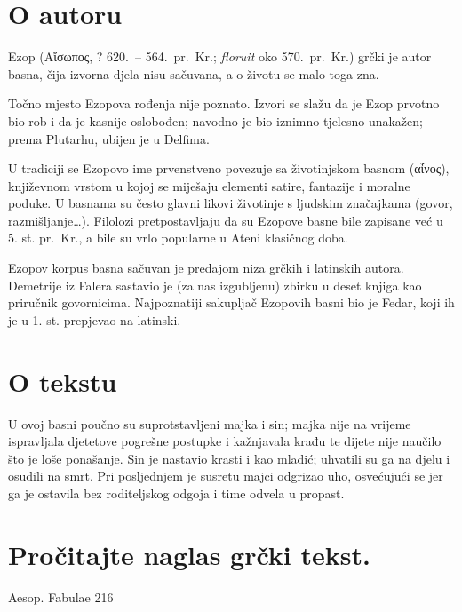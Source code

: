 \section*{O autoru}

Ezop \textgreek[variant=ancient]{(Αἴσωπος,} ? 620.\ – 564.\ pr.~Kr.; \textit{floruit} oko 570.\ pr.~Kr.) grčki je autor basna, čija izvorna djela nisu sačuvana, a o životu se malo toga zna.

Točno mjesto Ezopova rođenja nije poznato. Izvori se slažu da je Ezop prvotno bio rob i da je kasnije oslobođen; navodno je bio iznimno tjelesno unakažen; prema Plutarhu, ubijen je u Delfima.

U tradiciji se Ezopovo ime prvenstveno povezuje sa životinjskom basnom \textgreek[variant=ancient]{(αἶνος),} književnom vrstom u kojoj se miješaju elementi satire, fantazije i moralne poduke. U basnama su često glavni likovi životinje s ljudskim značajkama (govor, razmišljanje\dots). Filolozi pretpostavljaju da su Ezopove basne bile zapisane već u 5. st. pr.~Kr., a bile su vrlo popularne u Ateni klasičnog doba.

Ezopov korpus basna sačuvan je predajom niza grčkih i latinskih autora. Demetrije iz Falera sastavio je (za nas izgubljenu) zbirku u deset knjiga kao priručnik govornicima. Najpoznatiji sakupljač Ezopovih basni bio je Fedar, koji ih je u 1. st. prepjevao na latinski.


\section*{O tekstu}

U ovoj basni poučno su suprotstavljeni majka i sin; majka nije na vrijeme ispravljala djetetove pogrešne postupke i kažnjavala krađu te dijete nije naučilo što je loše ponašanje. Sin je nastavio krasti i kao mladić; uhvatili su ga na djelu i osudili na smrt. Pri posljednjem je susretu majci odgrizao uho, osvećujući se jer ga je ostavila bez roditeljskog odgoja i time odvela u propast.

\section*{Pročitajte naglas grčki tekst.}

Aesop. Fabulae 216

\medskip

